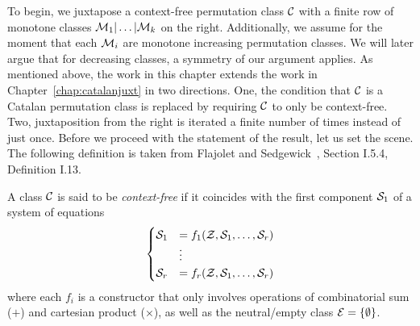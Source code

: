 \documentclass[12pt, a4paper, twoside]{report}
\begin{document}
To begin, we juxtapose a context-free permutation class $\C$ with a finite row of monotone classes $\M_1|\ldots|\M_k$ on the right. Additionally, we assume for the moment that each
$\M_i$ are monotone increasing permutation classes. We will later argue that for decreasing classes, a symmetry of our argument applies. As mentioned above, the work in this chapter extends the work in Chapter~\ref{chap:catalanjuxt} in two directions. One, the condition that $\C$ is a Catalan permutation class is replaced by requiring $\C$ to only be context-free. Two, juxtaposition from the right is iterated a finite number of times instead of just once. Before we proceed with the statement of the result, let us set the scene. The following definition is taken from Flajolet and Sedgewick~\cite{analcomb}, Section I.5.4, Definition I.13.
\begin{definition}
  A class $\C$ is said to be \emph{context-free} if it coincides with the first component $\S_1$ of a system of equations
  \begin{align}
  \begin{aligned}
    \begin{cases}
      \S_1 &= f_1(\Z,\S_1,\ldots,\S_r)\\
      &\vdots\\
      \S_r &= f_r(\Z,\S_1,\ldots,\S_r)
    \end{cases}
  \end{aligned}
  \end{align}
  where each $f_i$ is a constructor that only involves operations of combinatorial sum ($+$) and cartesian product ($\times$), as well as the neutral/empty class $\EE = \{\emptyset\}$.
\end{definition}
\end{document}
